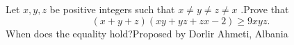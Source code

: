 Let $x,y,z$ be positive integers such that $x\neq y\neq z \neq x$ .Prove that $$(x+y+z)(xy+yz+zx-2)\geq 9xyz.$$When does the equality hold?Proposed by Dorlir Ahmeti, Albania